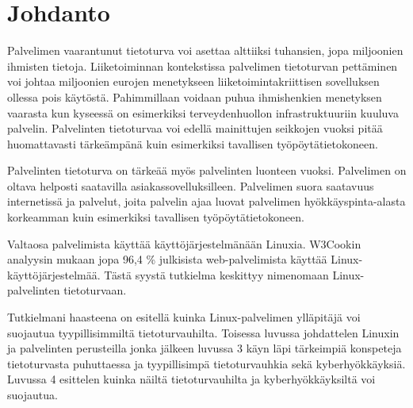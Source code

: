 \chapter{Johdanto}\label{Johdanto}

    Palvelimen vaarantunut tietoturva voi asettaa alttiiksi tuhansien, jopa miljoonien ihmisten tietoja. Liiketoiminnan kontekstissa palvelimen tietoturvan pettäminen voi johtaa miljoonien eurojen menetykseen liiketoimintakriittisen sovelluksen ollessa pois käytöstä. Pahimmillaan voidaan puhua ihmishenkien menetyksen vaarasta kun kyseessä on esimerkiksi terveydenhuollon infrastruktuuriin kuuluva palvelin. Palvelinten tietoturvaa voi edellä mainittujen seikkojen vuoksi pitää huomattavasti tärkeämpänä kuin esimerkiksi tavallisen työpöytätietokoneen.

    Palvelinten tietoturva on tärkeää myös palvelinten luonteen vuoksi. Palvelimen on oltava helposti saatavilla asiakassovelluksilleen. Palvelimen suora saatavuus internetissä ja palvelut, joita palvelin ajaa luovat palvelimen hyökkäyspinta-alasta korkeamman kuin esimerkiksi tavallisen työpöytätietokoneen.

    Valtaosa palvelimista käyttää käyttöjärjestelmänään Linuxia. W3Cookin analyysin mukaan jopa 96,4 \% julkisista web-palvelimista käyttää Linux-käyttöjärjestelmää\cite{w3cook}. Tästä syystä tutkielma keskittyy nimenomaan Linux-palvelinten tietoturvaan.

    Tutkielmani haasteena on esitellä kuinka Linux-palvelimen ylläpitäjä voi suojautua tyypillisimmiltä tietoturvauhilta. Toisessa luvussa johdattelen Linuxin ja palvelinten perusteilla jonka jälkeen luvussa 3 käyn läpi tärkeimpiä konspeteja tietoturvasta puhuttaessa ja tyypillisimpä tietoturvauhkia sekä kyberhyökkäyksiä. Luvussa 4 esittelen kuinka näiltä tietoturvauhilta ja kyberhyökkäyksiltä voi suojautua.
